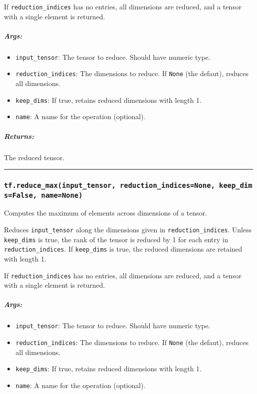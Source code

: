 If \texttt{reduction\_indices} has no entries, all dimensions are
reduced, and a tensor with a single element is returned.

\subparagraph{Args: }\label{args-40}

\begin{itemize}
\tightlist
\item
  \texttt{input\_tensor}: The tensor to reduce. Should have numeric
  type.
\item
  \texttt{reduction\_indices}: The dimensions to reduce. If
  \texttt{None} (the defaut), reduces all dimensions.
\item
  \texttt{keep\_dims}: If true, retains reduced dimensions with length
  1.
\item
  \texttt{name}: A name for the operation (optional).
\end{itemize}

\subparagraph{Returns: }\label{returns-40}

The reduced tensor.

\begin{center}\rule{0.5\linewidth}{\linethickness}\end{center}

\subsubsection{\texorpdfstring{\texttt{tf.reduce\_max(input\_tensor,\ reduction\_indices=None,\ keep\_dims=False,\ name=None)}
}{tf.reduce\_max(input\_tensor, reduction\_indices=None, keep\_dims=False, name=None) }}\label{tf.reduceux5fmaxinputux5ftensor-reductionux5findicesnone-keepux5fdimsfalse-namenone}

Computes the maximum of elements across dimensions of a tensor.

Reduces \texttt{input\_tensor} along the dimensions given in
\texttt{reduction\_indices}. Unless \texttt{keep\_dims} is true, the
rank of the tensor is reduced by 1 for each entry in
\texttt{reduction\_indices}. If \texttt{keep\_dims} is true, the reduced
dimensions are retained with length 1.

If \texttt{reduction\_indices} has no entries, all dimensions are
reduced, and a tensor with a single element is returned.

\subparagraph{Args: }\label{args-41}

\begin{itemize}
\tightlist
\item
  \texttt{input\_tensor}: The tensor to reduce. Should have numeric
  type.
\item
  \texttt{reduction\_indices}: The dimensions to reduce. If
  \texttt{None} (the defaut), reduces all dimensions.
\item
  \texttt{keep\_dims}: If true, retains reduced dimensions with length
  1.
\item
  \texttt{name}: A name for the operation (optional).
\end{itemize}


